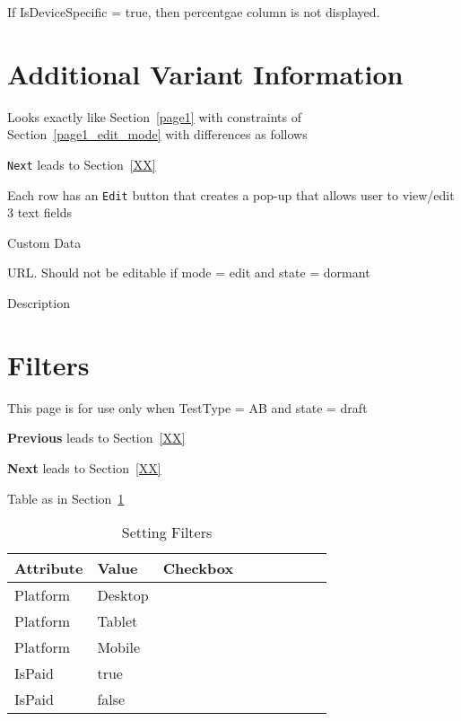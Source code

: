 \documentclass[letterpaper]{article}
\begin{document}
If IsDeviceSpecific = true, then percentgae column is not displayed.
\section{Additional Variant Information}
\label{addnl_variant_info}
Looks exactly like Section~\ref{page1}
with constraints of Section~\ref{page1_edit_mode} with differences as follows
\be
\item {\tt Next} leads to Section~\ref{XX}
\item Each row has
an {\tt Edit} button that creates a pop-up that allows user to view/edit 3 text
fields
\be
\item Custom Data
\item URL. Should not be editable if mode = edit and state = dormant
\item Description
\ee
\ee

\section{Filters}
\label{filters}
This page is for use only when TestType = AB and state = draft
\be
\item {\bf Previous} leads to Section~\ref{XX}
\item {\bf Next} leads to Section~\ref{XX}
\item Table as in Section~\ref{tbl_filters}
  \ee
\begin{table}[hb]
\centering
\begin{tabular}{|l|l|l|l|l|l|l|l|l|}  \hline \hline
  {\bf Attribute} &   {\bf Value} & {\bf Checkbox} \\ \hline \hline
  Platform & Desktop & \\ \hline
  Platform & Tablet & \\ \hline
  Platform & Mobile & \\ \hline
  \hline
  IsPaid & true & \\ \hline
  IsPaid & false & \\ \hline
\hline
\end{tabular}
\caption{Setting Filters}
\label{tbl_filters}
\end{table}
\end{document}
